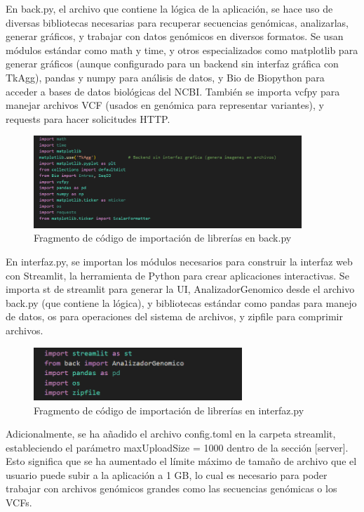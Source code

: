 \documentclass[11pt,spanish,listoffigures,listoftables]{tfgetsinf}
\begin{document}
En back.py, el archivo que contiene la lógica de la aplicación, se hace uso de diversas bibliotecas necesarias para recuperar secuencias genómicas, analizarlas, generar gráficos, y trabajar con datos genómicos en diversos formatos. Se usan módulos estándar como math y time, y otros especializados como matplotlib para generar gráficos (aunque configurado para un backend sin interfaz gráfica con TkAgg), pandas y numpy para análisis de datos, y Bio de Biopython para acceder a bases de datos biológicas del \acs{NCBI}. También se importa vcfpy para manejar archivos \acs{VCF} (usados en genómica para representar variantes), y requests para hacer solicitudes HTTP. 

\begin{figure}[H]
      \centering
      \includegraphics[width=0.9\textwidth]{Capturaback.PNG}
      \caption{Fragmento de código de importación de librerías en back.py}
      \label{fig:etiqueta_opcional125}
   \end{figure}

En interfaz.py, se importan los módulos necesarios para construir la interfaz web con Streamlit, la herramienta de Python para crear aplicaciones interactivas. Se importa st de streamlit para generar la UI, AnalizadorGenomico desde el archivo back.py (que contiene la lógica), y bibliotecas estándar como pandas para manejo de datos, os para operaciones del sistema de archivos, y zipfile para comprimir archivos.  

\begin{figure}[H]
      \centering
      \includegraphics[width=0.7\textwidth]{Capturainterfaz.PNG}
      \caption{Fragmento de código de importación de librerías en interfaz.py}
      \label{fig:etiqueta_opcional126}
   \end{figure}

Adicionalmente, se ha añadido el archivo config.toml en la carpeta streamlit, estableciendo el parámetro maxUploadSize = 1000 dentro de la sección [server]. Esto significa que se ha aumentado el límite máximo de tamaño de archivo que el usuario puede subir a la aplicación a 1 GB, lo cual es necesario para poder trabajar con archivos genómicos grandes como las secuencias genómicas o los \acs{VCF}s. 
\end{document}

